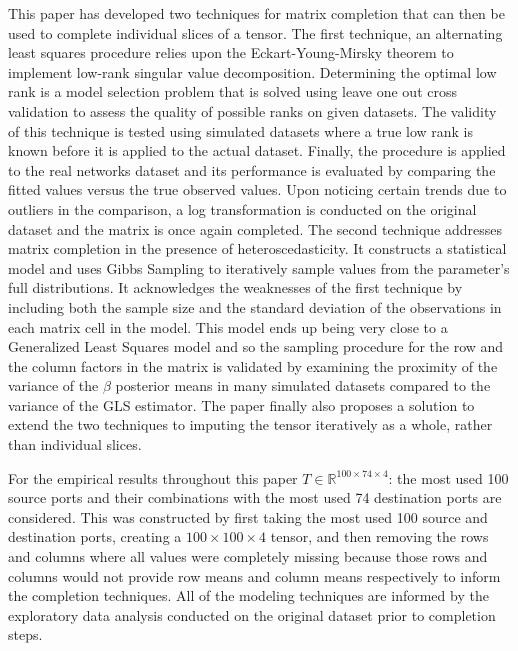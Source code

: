 \documentclass[12pt,twoside]{dukestatscithesis}
\theoremstyle{definition}
\theoremstyle{definition}
\theoremstyle{definition}
\theoremstyle{remark}
\begin{document}
This paper has developed two techniques for matrix completion that can
then be used to complete individual slices of a tensor. The first
technique, an alternating least squares procedure relies upon the
Eckart-Young-Mirsky theorem to implement low-rank singular value
decomposition. Determining the optimal low rank is a model selection
problem that is solved using leave one out cross validation to assess
the quality of possible ranks on given datasets. The validity of this
technique is tested using simulated datasets where a true low rank is
known before it is applied to the actual dataset. Finally, the procedure
is applied to the real networks dataset and its performance is evaluated
by comparing the fitted values versus the true observed values. Upon
noticing certain trends due to outliers in the comparison, a log
transformation is conducted on the original dataset and the matrix is
once again completed. The second technique addresses matrix completion
in the presence of heteroscedasticity. It constructs a statistical model
and uses Gibbs Sampling to iteratively sample values from the
parameter's full distributions. It acknowledges the weaknesses of the
first technique by including both the sample size and the standard
deviation of the observations in each matrix cell in the model. This
model ends up being very close to a Generalized Least Squares model and
so the sampling procedure for the row and the column factors in the
matrix is validated by examining the proximity of the variance of the
\(\beta\) posterior means in many simulated datasets compared to the
variance of the GLS estimator. The paper finally also proposes a
solution to extend the two techniques to imputing the tensor iteratively
as a whole, rather than individual slices.

For the empirical results throughout this paper
\(T \in \mathbb{R}^{100 \times 74 \times 4}\): the most used 100 source
ports and their combinations with the most used 74 destination ports are
considered. This was constructed by first taking the most used 100
source and destination ports, creating a \(100 \times 100 \times 4\)
tensor, and then removing the rows and columns where all values were
completely missing because those rows and columns would not provide row
means and column means respectively to inform the completion techniques.
All of the modeling techniques are informed by the exploratory data
analysis conducted on the original dataset prior to completion steps.
\end{document}
